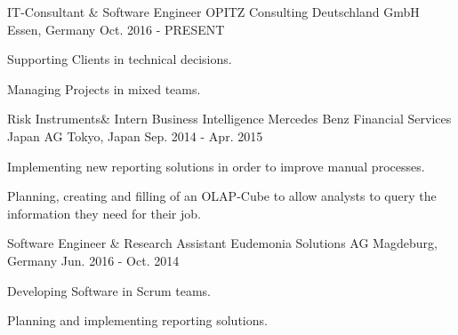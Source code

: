 

\begin{cventries}

  \cventry
    {IT-Consultant \& Software Engineer} %
    {OPITZ Consulting Deutschland GmbH} %
    {Essen, Germany} %
    {Oct. 2016 - PRESENT} %
    {
      \begin{cvitems} %
        \item{Supporting Clients in technical decisions.}
        \item{Managing Projects in mixed teams.}
      \end{cvitems}
    }
  \cventry
    {Risk Instruments\& Intern Business Intelligence} %
    {Mercedes Benz Financial Services Japan AG} %
    {Tokyo, Japan} %
    {Sep. 2014 - Apr. 2015} %
    {
      \begin{cvitems} %
        \item{Implementing new reporting solutions in order to improve manual processes.}
        \item{Planning, creating and filling of an OLAP-Cube to allow analysts to query the information they need for their job.}
      \end{cvitems}
    }
\cventry
    {Software Engineer \& Research Assistant} %
    {Eudemonia Solutions AG} %
    {Magdeburg, Germany} %
    {Jun. 2016 - Oct. 2014} %
    {
      \begin{cvitems} %
        \item{Developing Software in Scrum teams.}
        \item{Planning and implementing reporting solutions.}
      \end{cvitems}
    }

\end{cventries}
